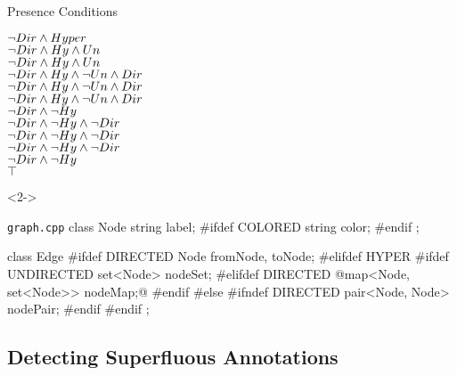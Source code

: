 \begin{frame}[b,fragile]{\myframetitle}
\begin{fancycolumns}[t,columns=3,widths={40,23,37},animation=none]
{\begin{exampletight}{Presence Conditions}
\begin{flushright}
					{\color{lecturegreen}$\neg Dir \wedge Hyper$}\\
					{\color{gray}$\neg Dir \wedge Hy \wedge Un$}\\
					{\color{gray}$\neg Dir \wedge Hy \wedge Un$}\\
					{\color{lecturered}$\neg Dir \wedge Hy \wedge \neg Un \wedge Dir$}\\
					{\color{lecturered}$\neg Dir \wedge Hy \wedge \neg Un \wedge Dir$}\\
					{\color{lecturered}$\neg Dir \wedge Hy \wedge \neg Un \wedge Dir$}\\
					{\color{gray}$\neg Dir \wedge \neg Hy$}\\
					{\color{gray}$\neg Dir \wedge \neg Hy \wedge \neg Dir$}\\
					{\color{gray}$\neg Dir \wedge \neg Hy \wedge \neg Dir$}\\
					{\color{gray}$\neg Dir \wedge \neg Hy \wedge \neg Dir$}\\
					{\color{gray}$\neg Dir \wedge \neg Hy$}\\
					{\color{gray}$\top$}
				\end{flushright}
			\end{exampletight}
		}
	\nextcolumn
		\begin{uncoverenv}<2->
			\begin{cpptight}[basicstyle=\small]{\texttt{graph.cpp}}
class Node {
	string label;
#ifdef COLORED
	string color;
#endif
};

class Edge {
#ifdef DIRECTED
	Node fromNode, toNode;
#elifdef HYPER
#ifdef UNDIRECTED
	set<Node> nodeSet;
#elifdef DIRECTED
	@map<Node, set<Node>> nodeMap;@
#endif
#else
#ifndef DIRECTED
	pair<Node, Node> nodePair;
#endif
#endif
};
			\end{cpptight}
		\end{uncoverenv}
	\end{fancycolumns}
\end{frame}

\subsection{Detecting Superfluous Annotations}


